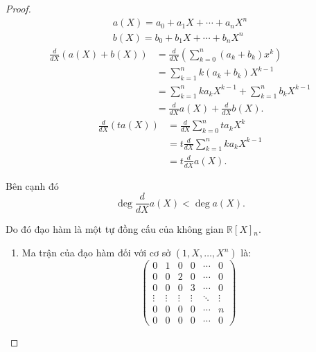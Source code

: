 \documentclass[class=nhvh-linear-algebra,crop=false]{standalone}
\begin{document}
\begin{proof}
    \[
        \begin{split}
            a(X) = a_{0} + a_{1}X + \cdots + a_{n}X^{n} \\
            b(X) = b_{0} + b_{1}X + \cdots + b_{n}X^{n}
        \end{split}
    \]
    \begin{align*}
        \frac{d}{dX}(a(X) + b(X)) & = \frac{d}{dX}\left(\sum^{n}_{k=0}(a_{k}+b_{k})x^{k}\right) \\
                                  & = \sum^{n}_{k=1}k(a_{k}+b_{k})X^{k-1}                       \\
                                  & = \sum^{n}_{k=1}ka_{k}X^{k-1} + \sum^{n}_{k=1}b_{k}X^{k-1}  \\
                                  & = \frac{d}{dX}a(X) + \frac{d}{dX}b(X).
    \end{align*}
    \begin{align*}
        \frac{d}{dX}(ta(X)) & = \frac{d}{dX}\sum^{n}_{k=0}ta_{k}X^{k}    \\
                            & = t\frac{d}{dX}\sum^{n}_{k=1}ka_{k}X^{k-1} \\
                            & = t\frac{d}{dX}a(X).
    \end{align*}
    \par Bên cạnh đó
    \[
        \deg \frac{d}{dX}a(X) < \deg a(X).
    \]
    \par Do đó đạo hàm là một tự đồng cấu của không gian $\mathbb{R}[X]{}_{n}$.
    \begin{enumerate}[label = (\alph*)]
        \item Ma trận của đạo hàm đối với cơ sở $(1, X, \ldots, X^{n})$ là:
              \[
                  \begin{pmatrix}
                      0      & 1      & 0      & 0      & \cdots & 0      \\
                      0      & 0      & 2      & 0      & \cdots & 0      \\
                      0      & 0      & 0      & 3      & \cdots & 0      \\
                      \vdots & \vdots & \vdots & \vdots & \ddots & \vdots \\
                      0      & 0      & 0      & 0      & \cdots & n      \\
                      0      & 0      & 0      & 0      & \cdots & 0
                  \end{pmatrix}
\]
\end{enumerate}
\end{proof}
\end{document}
